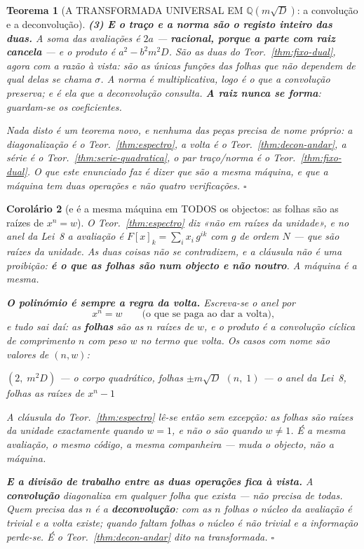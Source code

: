 \documentclass[11pt,a4paper]{article}
\newtheorem{teorema}{Teorema}
\newtheorem{corolario}[teorema]{Corolário}
\begin{document}
\begin{teorema}[A TRANSFORMADA UNIVERSAL EM $\mathbb{Q}(m\sqrt D)$: a convolução e a
deconvolução]
\textbf{(3) E o traço e a norma são o registo inteiro das duas.} A soma das avaliações é
$2a$ --- \textbf{racional, porque a parte com raiz cancela} --- e o produto é
$a^{2}-b^{2}m^{2}D$. São as duas do Teor.~\ref{thm:fixo-dual}, agora com a razão à vista:
\emph{são as únicas funções das folhas que não dependem de qual delas se chama $\sigma$}.
A norma é multiplicativa, logo é o que a convolução preserva; e é ela que a deconvolução
consulta. \textbf{A raiz nunca se forma}: guardam-se os coeficientes.

\medskip
\noindent Nada disto é um teorema novo, e nenhuma das peças precisa de nome próprio: a
diagonalização é o Teor.~\ref{thm:espectro}, a volta é o Teor.~\ref{thm:decon-andar}, a
série é o Teor.~\ref{thm:serie-quadratica}, o par traço/norma é o Teor.~\ref{thm:fixo-dual}.
\emph{O que este enunciado faz é dizer que são a mesma máquina}, e que a máquina tem duas
operações e não quatro verificações. $\square$
\end{teorema}
\begin{corolario}[e é a mesma máquina em TODOS os objectos: as folhas são as raízes de
$x^{n}=w$]\label{cor:folhas-do-polinomio}
O Teor.~\ref{thm:espectro} diz \emph{«não em raízes da unidade»}, e no anel da Lei~8 a
avaliação é $F[x]_k=\sum_i x_i\,g^{ik}$ com $g$ de ordem $N$ --- que são raízes da unidade.
As duas coisas não se contradizem, e a cláusula não é uma proibição: \textbf{é o que as
folhas são num objecto e não noutro}. A máquina é a mesma.

\textbf{O polinómio é sempre a regra da volta.} Escreva-se o anel por
\[
x^{n}=w \qquad\text{(o que se paga ao dar a volta),}
\]
e tudo sai daí: as \textbf{folhas} são as $n$ raízes de $w$, e o produto é a convolução
cíclica de comprimento $n$ com peso $w$ no termo que volta. Os casos com nome são valores
de $(n,w)$:
\begin{center}
$(2,\;m^{2}D)$ --- o corpo quadrático, folhas $\pm m\sqrt D$ \qquad
$(n,\;1)$ --- o anel da Lei~8, folhas as raízes de $x^{n}-1$
\end{center}
\emph{A cláusula do Teor.~\ref{thm:espectro} lê-se então sem excepção}: as folhas são
raízes da unidade exactamente quando $w=1$, e não o são quando $w\neq1$. É a mesma
avaliação, o mesmo código, a mesma companheira --- muda o objecto, não a máquina.

\textbf{E a divisão de trabalho entre as duas operações fica à vista.} A
\textbf{convolução} diagonaliza em \emph{qualquer} folha que exista --- não precisa de
todas. Quem precisa das $n$ é a \textbf{deconvolução}: com as $n$ folhas o núcleo da
avaliação é trivial e a volta existe; quando faltam folhas o núcleo é não trivial e a
informação perde-se. É o Teor.~\ref{thm:decon-andar} dito na transformada. $\square$
\end{corolario}
\end{document}
